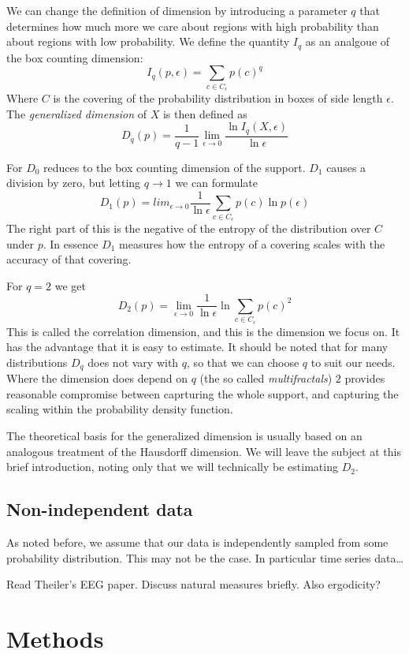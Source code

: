 \documentclass[10pt]{article}
\begin{document}
We can change the definition of dimension by introducing a parameter $q$ that determines how much more we care about regions with high probability than about regions with low probability. We define the quantity $I_q$ as an analgoue of the box counting dimension:
\[
I_q(p, \epsilon) = \sum_{c \in C_\epsilon}p(c)^q 
\]
Where $C$ is the covering of the probability distribution in boxes of side length $\epsilon$. The \textit{generalized dimension} of $X$ is then defined as
\[
D_q(p) = \frac{1}{q-1} \lim_{\epsilon \rightarrow 0} \frac{\ln I_q(X, \epsilon)}{\ln \epsilon}
\]

For $D_0$ reduces to the box counting dimension of the support. $D_1$ causes a division by zero, but letting $q \rightarrow 1$ we can formulate 
\[
D_1(p) = lim_{\epsilon \rightarrow 0} \frac{1}{\ln \epsilon} \sum_{c \in C_\epsilon} p(c) \ln p(\epsilon)
\] 
The right part of this is the negative of the entropy of the distribution over $C$ under $p$. In essence $D_1$ measures how the entropy of a covering scales with the accuracy of that covering.

For $q = 2$ we get 
\[
D_2(p) = \lim_{\epsilon \rightarrow 0} \frac{1}{\ln \epsilon}\ln \sum_{c \in C_\epsilon} {p(c)^2}
\]
This is called the correlation dimension, and this is the dimension we focus on. It has the advantage that it is easy to estimate. It should be noted that for many distributions $D_q$ does not vary with $q$, so that we can choose $q$ to suit our needs. Where the dimension does depend on $q$ (the so called \textit{multifractals}) $2$ provides reasonable compromise between caprturing the whole support, and capturing the scaling within the probability density function.

The theoretical basis for the generalized dimension is usually based on an analogous treatment of the Hausdorff dimension. We will leave the subject at this brief introduction, noting only that we will technically be estimating $D_2$.

\subsection{Non-independent data}

As noted before, we assume that our data is independently sampled from some probability distribution. This may not be the case. In particular time series data\ldots

Read Theiler's EEG paper. Discuss natural measures briefly. Also ergodicity?


\section{Methods}
\end{document}
